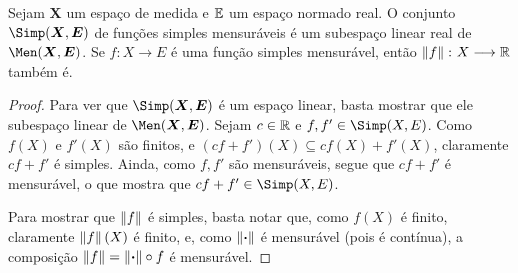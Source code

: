 \begin{prop}
Sejam $\bm X$ um espaço de medida e $\mathbb{E}$ um espaço normado real. O conjunto $\Simp(\bm X,\bm E)$ de funções simples mensuráveis é um subespaço linear real de $\Men(\bm X,\bm E)$. Se $f\colon X \to E$ é uma função simples mensurável, então $\left\Vert{f}\right\Vert\colon X \longrightarrow \mathbb{R}$ também é.
\end{prop}
\begin{proof}
Para ver que $\Simp(\bm X,\bm E)$ é um espaço linear, basta mostrar que ele subespaço linear de $\Men(\bm X,\bm E)$. Sejam $c \in \mathbb{R}$ e $f,f' \in \Simp(X,E)$. Como $f(X)$ e $f'(X)$ são finitos, e $(cf+f')(X) \subseteq cf(X) + f'(X)$, claramente $cf+f'$ é simples. Ainda, como $f,f'$ são mensuráveis, segue que $cf+f'$ é mensurável, o que mostra que $cf+f' \in \Simp(X,E)$.

Para mostrar que $\left\Vert{f}\right\Vert$ é simples, basta notar que, como $f(X)$ é finito, claramente $\left\Vert{f}\right\Vert(X)$ é finito, e, como $\left\Vert{\bm{\cdot}}\right\Vert$ é mensurável (pois é contínua), a composição $\left\Vert{f}\right\Vert = \left\Vert{\bm{\cdot}}\right\Vert \circ f$ é mensurável.
\end{proof}


